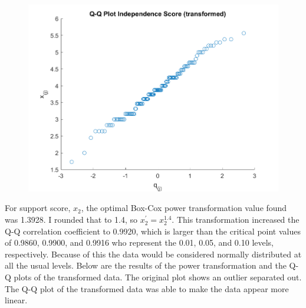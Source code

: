 \begin{enumerate}[label= (\alph*)]
    \begin{center}
        \begin{figure}[H]
            \centering
            \includegraphics[scale=0.4]{./matlab/chapter-4/sol4.39.qq.tr.1.png}
        \end{figure}
    \end{center}

    For support score, $x_{2}$, the optimal Box-Cox power transformation value found was 1.3928.
    I rounded that to 1.4, so $x_{2}^{\prime} = x_{2}^{1.4}$. This transformation increased the Q-Q correlation coefficient to 0.9920, which is larger than the critical point values of 0.9860, 0.9900, and 0.9916 who represent the 0.01, 0.05, and 0.10 levels, respectively.
    Because of this the data would be considered normally distributed at all the usual levels.
    Below are the results of the power transformation and the Q-Q plots of the transformed data.
    The original plot shows an outlier separated out. The Q-Q plot of the transformed data was able to make the data appear more linear.


\end{enumerate}
